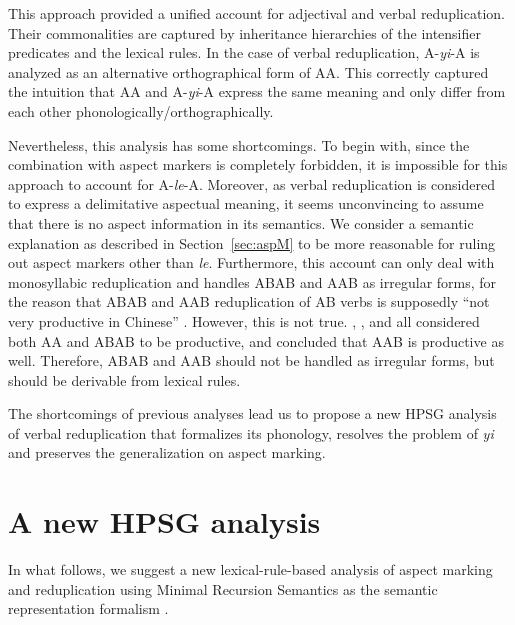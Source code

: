 \documentclass[11pt,a4paper,fleqn,draft]{article}
\begin{document}
This approach provided a unified account for adjectival and verbal reduplication.
Their commonalities are captured by inheritance hierarchies of the intensifier predicates and the lexical rules.
In the case of verbal reduplication, A-\emph{yi}-A is analyzed as an alternative orthographical form of AA.
This correctly captured the intuition that AA and A-\emph{yi}-A express the same meaning and only differ from each other phonologically/orthographically.

Nevertheless, this analysis has some shortcomings.
To begin with, since the combination with aspect markers is completely forbidden, it is impossible for this approach to account for A-\emph{le}-A.
Moreover, as verbal reduplication is  considered to express a delimitative aspectual meaning,
it seems unconvincing to assume that there is no aspect information in its semantics.
We consider a semantic explanation as described in Section~\ref{sec:aspM} to be more reasonable for ruling out aspect markers other than \emph{le}.
Furthermore, this account can only deal with monosyllabic reduplication and handles ABAB and AAB as irregular forms, for the reason that ABAB and AAB reduplication of AB verbs is supposedly ``not very productive in Chinese'' \citep[102]{FanSongBond2015}.
However, this is not true. 
\citet{BascianoMelloni2017}, \citet{MelloniBasciano2018},  \citet{Xie2020}  and \citet{Xing2000stat} all considered both AA and ABAB to be productive, 
and \citet{Xing2000stat} concluded that AAB is productive as well.
Therefore, ABAB and AAB should not be handled as  irregular forms, 
but should be derivable from lexical rules.

The shortcomings of previous analyses lead us to propose a new HPSG analysis of verbal reduplication that formalizes its phonology, resolves the problem of \emph{yi} and preserves the generalization on aspect marking.




\section{A new HPSG analysis}\label{ch:HPSG-redup}

In what follows, we suggest a new lexical-rule-based analysis of aspect marking and reduplication
using Minimal Recursion Semantics as the semantic representation formalism \citep{CFPS2005a}.
\end{document}
